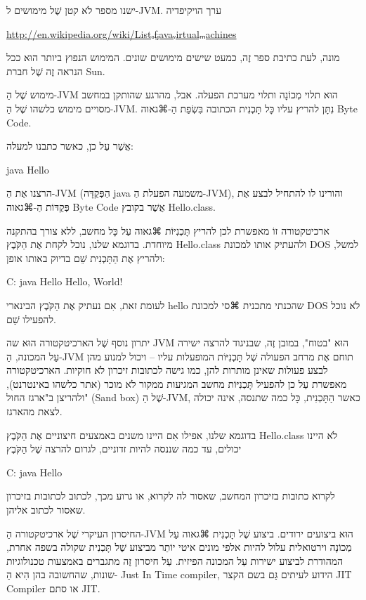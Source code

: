 ישנו מספר לֹא קטן שֶׁל מימושים ל-JVM. ערך הויקיפדיה
\begin{english}
\url{http://en.wikipedia.org/wiki/Listₒfⱼavaᵥirtualₘachines}
\end{english}

מונה, לעת כתיבת ספר זֶה, כמעט שישים מימושים שונים. המימוש הנפוץ ביותר הוּא ככל
הנראה זֶה שֶׁל חברת Sun.

מימוש שֶׁל הַ-JVM הוּא תלוי מְכוֹנָה ותלוי מערכת הפעלה. אבל, מהרגע שהותקן במחשב
מסויים מימוש כלשהו שֶׁל הַ-JVM. נִתָּן להריץ עליו כָּל תָּכְנִית הכתובה
בִּשְׂפַת הַ-⌘גאוה Byte Code.

אֲשֶׁר עַל כן, כאשר כתבנו למעלה:

java Hello
\END

הרצנו אֶת הַ-JVM (הַפְּקֻדָּה java משמעה הפעלת הַ-JVM), והורינו לו להתחיל לבצע
אֶת פְּקֻדּוֹת הַ-⌘גאוה Byte Code אֲשֶׁר בקובץ Hello.class.

ארכיטקטורה זוֹ מאפשרת לכן להריץ תָּכְנִיּוֹת ⌘גאוה עַל כָּל מחשב, ללא צורך בהתקנה
מיוחדת. בדוגמא שלנו, נוכל לקחת אֶת הַקֹּבֶץ Hello.class ולהעתיק אותו למכונת DOS
למשל, ולהריץ אֶת הַתָּכְנִית שֵׁם בדיוק באותו אופן:

\begin{NONE}
C:\> java Hello
Hello, World!
\end{NONE}

לעומת זאת, אִם נעתיק אֶת הַקֹּבֶץ הבינארי hello שהכנתי מתכנית ⌘סי למכונת DOS לֹא
נוכל להפעילו שֵׁם.

יתרון נוסף שֶׁל הארכיטקטורה הוּא שה JVM הוּא "בטוח", במובן זֶה, שבניגוד להרצה
ישירה עַל המכונה, הַ-JVM תוחם אֶת מרחב הפעולה שֶׁל תָּכְנִיּוֹת המופעלות עליו –
ויכול למנוע מהן לבצע פעולות שאינן מותרות להן, כמו גישה לכתובות זיכרון לֹא
חוקיות. הארכיטקטורה מאפשרת עַל כן להפעיל תָּכְנִיּוֹת מחשב המגיעות ממקור לֹא
מוכר (אתר כלשהו באינטרנט), ולהריצן ב"ארגז החול" (Sand box) שֶׁל הַ-JVM, כאשר
הַתָּכְנִית, כָּל כמה שתנסה, אינה יכולה לצאת מהארגז.

בדוגמא שלנו, אפילו אִם היינו משנים באמצעים חיצוניים אֶת הַקֹּבֶץ Hello.class לֹא
היינו יכולים, עד כמה שננסה להיות זדוניים, לגרום להרצה שֶׁל הַקֹּבֶץ
\begin{NONE}
C:\> java Hello
\end{NONE}

לקרוא כתובות בזיכרון המחשב, שאסור לה לקרוא, או גרוע מכך, לכתוב לכתובות בזיכרון
שאסור לכתוב אליהן.

החיסרון העיקרי שֶׁל ארכיטקטורה הַ-JVM הוּא ביצועים ירודים. ביצוע שֶׁל תָּכְנִית
⌘גאוה עַל מְכוֹנָה וירטואלית עלול להיות אלפי מונים איטי יוֹתֵר מביצוע שֶׁל
תָּכְנִית שקולה בשפה אחרת, המהודרת לביצוע ישירות עַל המכונה הפיזית. עַל חיסרון
זֶה מתגברים באמצעות טכנולוגיות שונות, שהחשובה בהן הִיא הַ- Just In Time
compiler, הידוע לעיתים גַּם בשם הקצר JIT Compiler או סתם JIT.

